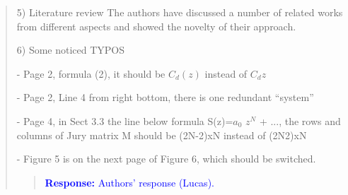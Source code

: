 \documentclass[11pt]{article}
\begin{document}
\begin{quote}
5) Literature review
The authors have discussed a number of related works from different aspects and showed the novelty of their approach.

6) Some noticed TYPOS

- Page 2, formula (2), it should be $C_d(z)$ instead of $C_dz$

- Page 2, Line 4 from right bottom, there is one redundant ``system''

- Page 4, in Sect 3.3 the line below formula S(z)=$a_0$ $z^N$ + $...$, the rows and columns of Jury matrix M should be (2N-2)xN instead of (2N2)xN

- Figure 5 is on the next page of Figure 6, which should be switched.

\begin{quote}
\textcolor{blue}{\textbf{Response:} Authors' response (Lucas).}
\end{quote}


\end{quote}

\label{LastPage}
\end{document}

